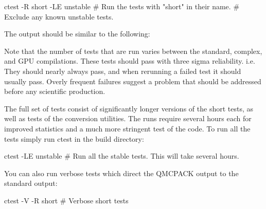 \begin{shade}
ctest -R short -LE unstable  # Run the tests with "short" in their name.
                             # Exclude any known unstable tests.
\end{shade}
The output should be similar to the following:


Note that the number of tests that are run varies between the
standard, complex, and GPU compilations. These tests should pass with three sigma reliability. i.e. They should nearly always pass, and when rerunning a failed test it should usually pass. Overly frequent failures suggest a problem that should be addressed before any scientific production.

The  full set of tests consist of significantly longer versions of the short
tests, as well as tests of the conversion utilities. The runs require
several hours each for improved statistics and a much more
stringent test of the code. To run all the tests simply run ctest in the build
directory:

\begin{shade}
ctest -LE unstable           # Run all the stable tests. This will take several hours.
\end{shade}

You can also run verbose tests which direct the QMCPACK
output to the standard output:

\begin{shade}
ctest -V -R short   # Verbose short tests
\end{shade}

